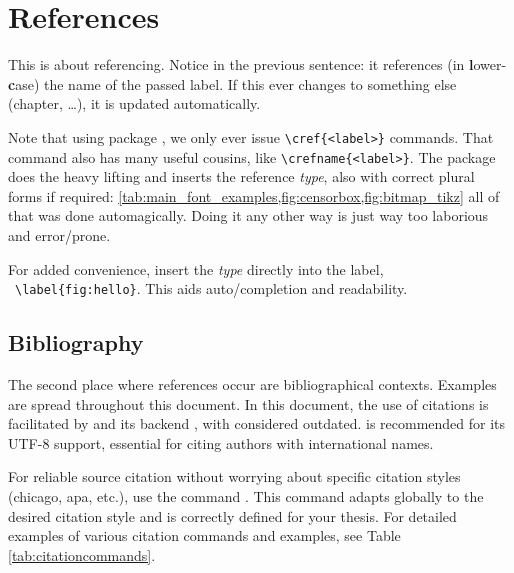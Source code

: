 \section{References}
\label{ch:references}

This \textcolor{mRed}{} is about referencing.
Notice {\color{mRed}{\verb|\lcnamecref|}} in the previous sentence:
it references (in \textbf{l}ower-\textbf{c}ase) the name of the passed label.
If this  ever changes to something else (chapter, \dots),
it is updated automatically.

Note that using package , we only ever issue
\verb|\cref{<label>}| commands.
That command also has many useful cousins, like \verb|\crefname{<label>}|.
The package does the heavy lifting and inserts the reference \emph{type},
also with correct plural forms if required:
\cref{tab:main_font_examples,fig:censorbox,fig:bitmap_tikz}
\textleftarrow{} all of that was done automagically.
Doing it any other way is just way too laborious and error\-/prone.

For added convenience, insert the \emph{type} directly into the label,
\ \verb|\label{fig:hello}|.
This aids auto\-/completion and readability.

\subsection{Bibliography}
\label{ch:bibliography_rationale}

The second place where references occur are bibliographical contexts.
Examples are spread throughout this document.
In this document, the use of citations is facilitated by  and its backend , with  considered outdated.  is recommended for its UTF-8 support, essential for citing authors with international names.

For reliable source citation without worrying about specific citation styles (chicago, apa, etc.), use the command . This command adapts globally to the desired citation style and is correctly defined for your thesis. For detailed examples of various citation commands and examples, see Table \ref{tab:citationcommands}.

